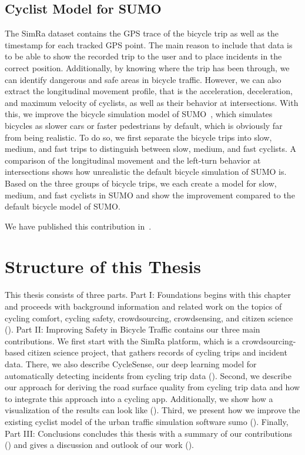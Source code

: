 \subsection{Cyclist Model for SUMO}
\label{subsec:sumo_contribution}
The SimRa dataset contains the GPS trace of the bicycle trip as well as the timestamp for each tracked GPS point.
The main reason to include that data is to be able to show the recorded trip to the user and to place incidents in the correct position.
Additionally, by knowing where the trip has been through, we can identify dangerous and safe areas in bicycle traffic.
However, we can also extract the longitudinal movement profile, that is the acceleration, deceleration, and maximum velocity of cyclists, as well as their behavior at intersections.
With this, we improve the bicycle simulation model of SUMO~\cite{lopez2018microscopic}, which simulates bicycles as slower cars or faster pedestrians by default, which is obviously far from being realistic.
To do so, we first separate the bicycle trips into slow, medium, and fast trips to distinguish between slow, medium, and fast cyclists.
A comparison of the longitudinal movement and the left-turn behavior at intersections shows how unrealistic the default bicycle simulation of SUMO is.
Based on the three groups of bicycle trips, we each create a model for slow, medium, and fast cyclists in SUMO and show the improvement compared to the default bicycle model of SUMO.

We have published this contribution in~\cite{karakaya2022realistic,karakaya2023achieving}.

\section{Structure of this Thesis}
\label{sec:structure}

This thesis consists of three parts.
Part I: Foundations begins with this chapter and proceeds with background information and related work on the topics of cycling comfort, cycling safety, crowdsourcing, crowdsensing, and citizen science ().
Part II: Improving Safety in Bicycle Traffic contains our three main contributions.
We first start with the SimRa platform, which is a crowdsourcing-based citizen science project, that gathers records of cycling trips and incident data.
There, we also describe CycleSense, our deep learning model for automatically detecting incidents from cycling trip data ().
Second, we describe our approach for deriving the road surface quality from cycling trip data and how to integrate this approach into a cycling app.
Additionally, we show how a visualization of the results can look like ().
Third, we present how we improve the existing cyclist model of the urban traffic simulation software \ac{sumo} ().
Finally, Part III: Conclusions concludes this thesis with a summary of our contributions () and gives a discussion and outlook of our work ().
